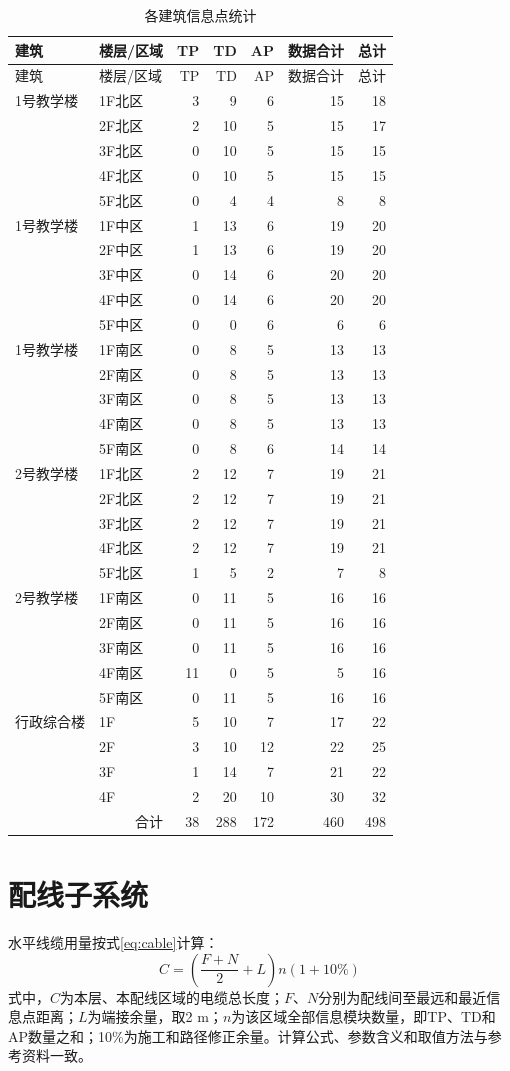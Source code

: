 \documentclass[UTF8,zihao=-4,openany]{ctexrep}
\begin{document}
\begin{longtable}{llrrrrr}
\caption{各建筑信息点统计}\label{tab:points}\\
\toprule
建筑&楼层/区域&TP&TD&AP&数据合计&总计\\
\midrule
\endfirsthead
\toprule
建筑&楼层/区域&TP&TD&AP&数据合计&总计\\
\midrule
\endhead
1号教学楼&1F北区&3&9&6&15&18\\
&2F北区&2&10&5&15&17\\
&3F北区&0&10&5&15&15\\
&4F北区&0&10&5&15&15\\
&5F北区&0&4&4&8&8\\
1号教学楼&1F中区&1&13&6&19&20\\
&2F中区&1&13&6&19&20\\
&3F中区&0&14&6&20&20\\
&4F中区&0&14&6&20&20\\
&5F中区&0&0&6&6&6\\
1号教学楼&1F南区&0&8&5&13&13\\
&2F南区&0&8&5&13&13\\
&3F南区&0&8&5&13&13\\
&4F南区&0&8&5&13&13\\
&5F南区&0&8&6&14&14\\
\midrule
2号教学楼&1F北区&2&12&7&19&21\\
&2F北区&2&12&7&19&21\\
&3F北区&2&12&7&19&21\\
&4F北区&2&12&7&19&21\\
&5F北区&1&5&2&7&8\\
2号教学楼&1F南区&0&11&5&16&16\\
&2F南区&0&11&5&16&16\\
&3F南区&0&11&5&16&16\\
&4F南区&11&0&5&5&16\\
&5F南区&0&11&5&16&16\\
\midrule
行政综合楼&1F&5&10&7&17&22\\
&2F&3&10&12&22&25\\
&3F&1&14&7&21&22\\
&4F&2&20&10&30&32\\
\midrule
\multicolumn{2}{r}{合计}&38&288&172&460&498\\
\bottomrule
\end{longtable}

\section{配线子系统}
水平线缆用量按式\eqref{eq:cable}计算：
\begin{equation}
C=\left(\frac{F+N}{2}+L\right)n(1+10\%)
\label{eq:cable}
\end{equation}
式中，$C$为本层、本配线区域的电缆总长度；$F$、$N$分别为配线间至最远和最近信息点距离；$L$为端接余量，取2 m；$n$为该区域全部信息模块数量，即TP、TD和AP数量之和；10\%为施工和路径修正余量。计算公式、参数含义和取值方法与参考资料一致。
\end{document}
